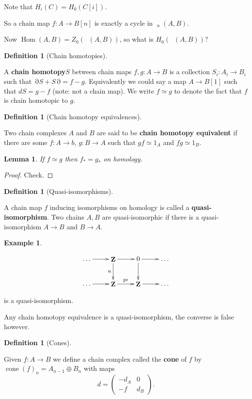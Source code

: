 \documentclass[10pt,]{book}
\newcommand{\terminology}[1]{\textbf{#1}}
\theoremstyle{plain}
\newtheorem{lemma}[theorem]{Lemma}
\theoremstyle{definition}
\newtheorem{definition}[theorem]{Definition}
\newtheorem{example}[theorem]{Example}
\numberwithin{equation}{section}
\renewenvironment{figure}%
{\begin{mbxfigure}\setcounter{mbxfigure}{\value{theorem}}\stepcounter{theorem}}%
{\end{mbxfigure}}
\DeclareMathOperator{\Hom}{Hom}
\DeclareMathOperator{\cHom}{\underline{Hom}}
\DeclareMathOperator{\cone}{cone}
\DeclareMathOperator{\dd}{\partial}
\DeclareMathOperator{\ZZ}{\mathbf{Z}}
\begin{document}
\par
Note that \(H_i(C) = H_0(C[i])\).%
\par
So a chain map \(f\colon A \to B[n]\) is exactly a cycle in \(\cHom_n(A,B)\).%
\par
Now \(\Hom(A,B) = Z_0(\cHom(A,B))\), so what is \(H_0(\cHom(A,B))\)?%
\begin{definition}[Chain homotopies]\label{definition-12}

            A \terminology{chain homotopy}\(S\) between chain maps \(f,g\colon A \to B\) is a collection \(S_i \colon A_i \to B_i\) such that \(\dd S + S\dd = f-g\).
            Equivalently we could say a map \(A \to B[1]\) such that \(dS = g -f\) (note: not a chain map).
            We write \(f \simeq g\) to denote the fact that \(f\) is chain homotopic to \(g\).
          \end{definition}
\begin{definition}[Chain homotopy equivalences]\label{definition-13}

            Two chain complexes \(A\) and \(B\) are said to be \terminology{chain homotopy equivalent} if there are some \(f\colon A\to b\), \(g\colon B \to A\) such that \(gf \simeq 1_A\) and \(fg\simeq 1_B\).
          \end{definition}
\begin{lemma}\label{lemma-2}
If \(f\simeq g\) then \(f_* = g_*\) on homology.\end{lemma}
\begin{proof}
Check.\end{proof}
\begin{definition}[Quasi-isomorphisms]\label{definition-14}

            A chain map \(f\) inducing isomorphisms on homology is called a \terminology{quasi-isomorphism}.
            Two chains \(A,B\) are quasi-isomorphic if there is a quasi-isomorphism \(A \to B\) and \(B\to A\).
          \end{definition}
\begin{example}\label{example-6}
\begin{figure}
\centering
\[
                \xymatrix{
                  \dots\ar[r] &\ZZ \ar[r]\ar[d]_n &0 \ar[r]\ar[d] &\dots \\
                  \dots\ar[r] &\ZZ \ar[r]^{\text{pr}} &\ZZ \ar[r] &\dots
                }
              \]\end{figure}

            is a quasi-isomorphism.
          \end{example}
\par
Any chain homotopy equivalence is a quasi-isomorphism, the converse is false however.%
\begin{definition}[Cones]\label{definition-15}

            Given \(f\colon A \to B\) we define a chain complex called the \terminology{cone} of \(f\) by \(\cone(f)_n = A_{n-1} \oplus B_n\) with maps \[d = \begin{pmatrix}-d_A & 0 \\ -f & d_B\end{pmatrix}.\]\end{definition}
\par
\end{document}
